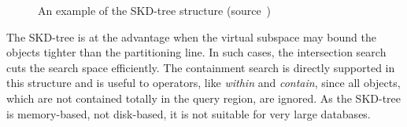 \documentclass[a4paper,12pt]{article}
\begin{document}
\begin{figure}
\centering
{}
\centering
{}
\caption{An example of the SKD-tree structure (source~\cite{survey})}
\label{figskdtree}
\end{figure}
The SKD-tree is at the advantage when the virtual subspace may bound the objects tighter than the partitioning line. In such cases, the intersection search cuts the search space efficiently. The containment search is directly supported in this structure and is useful to operators, like \textit{within} and \textit{contain}, since all objects, which are not contained totally in the query region, are ignored.
As the SKD-tree is memory-based, not disk-based, it is not suitable for very large databases.

\end{document}
